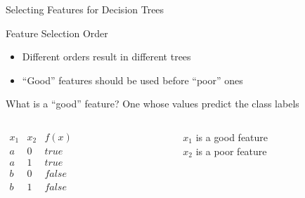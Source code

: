 \documentclass[14pt]{beamer}
\begin{document}
\begin{frame}{Selecting Features for Decision Trees}
\begin{block}{Feature Selection Order}
\begin{itemize}
\item Different orders result in different trees
\item ``Good'' features should be used before ``poor'' ones
\end{itemize}
\end{block}
\pause
\begin{block}{What is a ``good'' feature?}
One whose values predict the class labels \\
\end{block}
\pause
\medskip
\begin{columns}
\begin{column}{1.2in}
$
\begin{array}{lll}
x_1 & x_2 & f(x) \\
\hline
a & 0 & \textit{true} \\
a & 1 & \textit{true} \\
b & 0 & \textit{false} \\
b & 1 & \textit{false} \\
\end{array}
$
\end{column}
\pause
\begin{column}{1.8in}
$x_1$ is a \alert{good} feature \\
\bigskip
$x_2$ is a \alert{poor} feature
\end{column}
\end{columns}
\end{frame}
\end{document}
